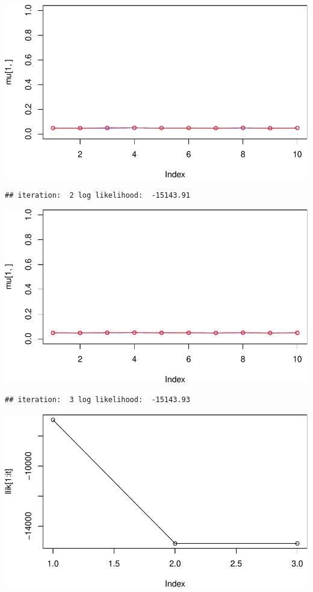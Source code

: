 \documentclass[
]{article}
\begin{document}
\includegraphics{Lab1Block2_files/figure-latex/unnamed-chunk-1-3.pdf}

\begin{verbatim}
## iteration:  2 log likelihood:  -15143.91
\end{verbatim}

\includegraphics{Lab1Block2_files/figure-latex/unnamed-chunk-1-4.pdf}

\begin{verbatim}
## iteration:  3 log likelihood:  -15143.93
\end{verbatim}

\includegraphics{Lab1Block2_files/figure-latex/unnamed-chunk-1-5.pdf}
\end{document}
